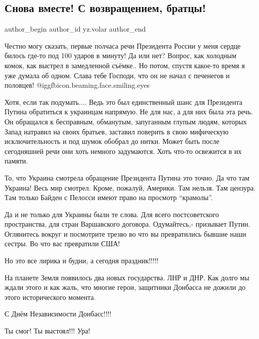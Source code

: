  
 
 
 
 
 
\subsection{Снова вместе! С возвращением, братцы!}
\label{sec:21_02_2022.yz.volar.1.snova_vmeste}
 
\ifcmt
 author_begin
   author_id yz.volar
 author_end
\fi

Честно могу сказать, первые полчаса речи Президента России у меня сердце билось
где-то под 100 ударов в минуту! Да или нет? Вопрос, как холодным комок, как
выстрел в замедленной съёмке.. Но потом, спустя какое-то время я уже думала об
одном. Слава тебе Господи, что он не начал с печенегов и половцев! @igg{fbicon.beaming.face.smiling.eyes} 


Хотя, если так подумать.... Ведь это был единственный шанс для Президента
Путина обратиться к украинцам напрямую. Не для нас, а для них была эта речь. Он
обращался к бесправным, обманутым, запуганным глупым людям, которых Запад
натравил на своих братьев, заставил поверить в свою мифическую исключительность
и под шумок обобрал до нитки. Может быть после сегодняшней речи они хоть
немного задумаются. Хоть что-то освежится в их памяти.

То, что Украина смотрела обращение Президента Путина это точно. Да что там
Украина! Весь мир смотрел. Кроме, пожалуй, Америки. Там нельзя. Там цензура.
Там только Байден с Пелосси имеют право на просмотр \enquote{крамолы}.

Да и не только для Украины были те слова. Для всего постсоветского
пространства, для стран Варшавского договора. Одумайтесь,- призывает Путин.
Оглянитесь вокруг и посмотрите трезво во что вы превратились бывшие наши
сестры. Во что вас превратили США!

Но это все лирика и будни, а сегодня праздник!!!!!

На планете Земля появилось два новых государства. ЛНР и ДНР. Как долго мы ждали
этого и как жаль, что многие герои, защитники Донбасса не дожили до этого
исторического момента.

С Днём Независимости Донбасс!!!!

Ты смог! Ты выстоял!!! Ура!
